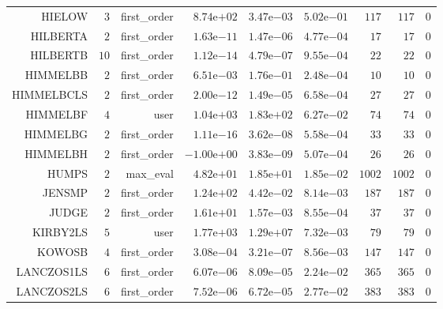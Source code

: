 \begin{longtable}{rrrrrrrrr}
HIELOW & \(     3\) & first\_order & \( 8.74\)e\(+02\) & \( 3.47\)e\(-03\) & \( 5.02\)e\(-01\) & \(   117\) & \(   117\) & \(     0\) \\
HILBERTA & \(     2\) & first\_order & \( 1.63\)e\(-11\) & \( 1.47\)e\(-06\) & \( 4.77\)e\(-04\) & \(    17\) & \(    17\) & \(     0\) \\
HILBERTB & \(    10\) & first\_order & \( 1.12\)e\(-14\) & \( 4.79\)e\(-07\) & \( 9.55\)e\(-04\) & \(    22\) & \(    22\) & \(     0\) \\
HIMMELBB & \(     2\) & first\_order & \( 6.51\)e\(-03\) & \( 1.76\)e\(-01\) & \( 2.48\)e\(-04\) & \(    10\) & \(    10\) & \(     0\) \\
HIMMELBCLS & \(     2\) & first\_order & \( 2.00\)e\(-12\) & \( 1.49\)e\(-05\) & \( 6.58\)e\(-04\) & \(    27\) & \(    27\) & \(     0\) \\
HIMMELBF & \(     4\) & user & \( 1.04\)e\(+03\) & \( 1.83\)e\(+02\) & \( 6.27\)e\(-02\) & \(    74\) & \(    74\) & \(     0\) \\
HIMMELBG & \(     2\) & first\_order & \( 1.11\)e\(-16\) & \( 3.62\)e\(-08\) & \( 5.58\)e\(-04\) & \(    33\) & \(    33\) & \(     0\) \\
HIMMELBH & \(     2\) & first\_order & \(-1.00\)e\(+00\) & \( 3.83\)e\(-09\) & \( 5.07\)e\(-04\) & \(    26\) & \(    26\) & \(     0\) \\
HUMPS & \(     2\) & max\_eval & \( 4.82\)e\(+01\) & \( 1.85\)e\(+01\) & \( 1.85\)e\(-02\) & \(  1002\) & \(  1002\) & \(     0\) \\
JENSMP & \(     2\) & first\_order & \( 1.24\)e\(+02\) & \( 4.42\)e\(-02\) & \( 8.14\)e\(-03\) & \(   187\) & \(   187\) & \(     0\) \\
JUDGE & \(     2\) & first\_order & \( 1.61\)e\(+01\) & \( 1.57\)e\(-03\) & \( 8.55\)e\(-04\) & \(    37\) & \(    37\) & \(     0\) \\
KIRBY2LS & \(     5\) & user & \( 1.77\)e\(+03\) & \( 1.29\)e\(+07\) & \( 7.32\)e\(-03\) & \(    79\) & \(    79\) & \(     0\) \\
KOWOSB & \(     4\) & first\_order & \( 3.08\)e\(-04\) & \( 3.21\)e\(-07\) & \( 8.56\)e\(-03\) & \(   147\) & \(   147\) & \(     0\) \\
LANCZOS1LS & \(     6\) & first\_order & \( 6.07\)e\(-06\) & \( 8.09\)e\(-05\) & \( 2.24\)e\(-02\) & \(   365\) & \(   365\) & \(     0\) \\
LANCZOS2LS & \(     6\) & first\_order & \( 7.52\)e\(-06\) & \( 6.72\)e\(-05\) & \( 2.77\)e\(-02\) & \(   383\) & \(   383\) & \(     0\) \\

\end{longtable}

